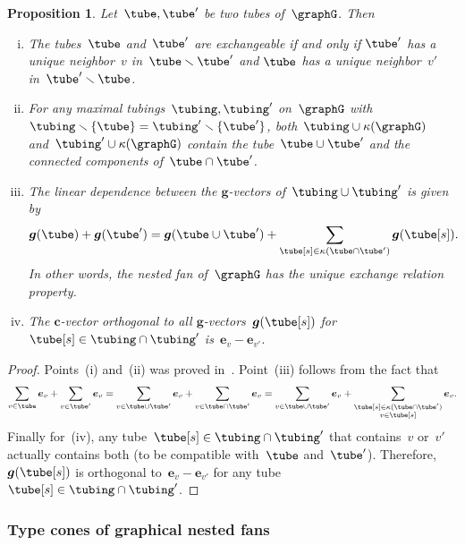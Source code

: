 \documentclass{amsart}
\newtheorem{proposition}[theorem]{Proposition}
\theoremstyle{definition}
\renewcommand{\b}[1]{{\boldsymbol{#1}}} %
\newcommand{\ssm}{\smallsetminus} %
\newcommand{\gvector}[1]{\b{g}(#1)} %
\newcommand{\connectedComponents}{\kappa} %
\begin{document}
\begin{proposition}
\label{prop:exchangeablePairsGA}
Let~$\tube, \tube'$ be two tubes of~$\graphG$. Then
\begin{enumerate}[(i)]
\item The tubes~$\tube$ and~$\tube'$ are exchangeable if and only if $\tube'$ has a unique neighbor~$v$ in~$\tube \ssm \tube'$ and $\tube$ has a unique neighbor~$v'$ in~$\tube' \ssm \tube$.
\item For any maximal tubings~$\tubing, \tubing'$ on~$\graphG$ with $\tubing \ssm \{\tube\} = \tubing' \ssm \{\tube'\}$, both~$\tubing \cup \connectedComponents(\graphG)$ and~$\tubing' \cup \connectedComponents(\graphG)$ contain the tube~$\tube \cup \tube'$ and the connected components of~$\tube \cap \tube'$.
\item The linear dependence between the $\b{g}$-vectors of~$\tubing \cup \tubing'$ is given by
\[
\gvector{\tube} + \gvector{\tube'} = \gvector{\tube \cup \tube'} + \sum_{\tube[s] \in \connectedComponents(\tube \cap \tube')} \gvector{\tube[s]}.
\]
In other words, the nested fan of~$\graphG$ has the unique exchange relation property.
\item The $\b{c}$-vector orthogonal to all $\b{g}$-vectors~$\gvector{\tube[s]}$ for~$\tube[s] \in \tubing \cap \tubing'$ is~$\b{e}_v - \b{e}_{v'}$.
\end{enumerate}
\end{proposition}

\begin{proof}
Points~(i) and~(ii) was proved in~\cite{MannevillePilaud-compatibilityFans}. Point~(iii) follows from the fact that
\[
\sum_{v \in \tube} \b{e}_v + \sum_{v \in \tube'} \b{e}_v = \sum_{v \in \tube \cup \tube'} \b{e}_v + \sum_{v \in \tube \cap \tube'} \b{e}_v = \sum_{v \in \tube \cup \tube'} \b{e}_v + \sum_{\substack{\tube[s] \in \connectedComponents(\tube \cap \tube') \\ v \in \tube[s]}} \b{e}_v.
\]
Finally for~(iv), any tube~$\tube[s] \in \tubing \cap \tubing'$ that contains~$v$ or~$v'$ actually contains both (to be compatible with~$\tube$ and~$\tube'$). Therefore, $\gvector{\tube[s]}$ is orthogonal to~$\b{e}_v - \b{e}_{v'}$ for any tube~$\tube[s] \in \tubing \cap \tubing'$.
\end{proof}


\subsubsection{Type cones of graphical nested fans}
\end{document}
